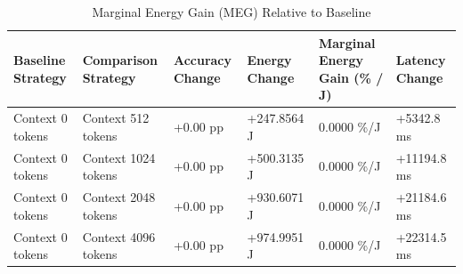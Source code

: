 \begin{table}
\caption{Marginal Energy Gain (MEG) Relative to Baseline}
\label{tab:marginal_energy_gain}
\begin{tabular}{llllll}
\toprule
Baseline Strategy & Comparison Strategy & Accuracy Change & Energy Change & Marginal Energy Gain (\% / J) & Latency Change \\
\midrule
Context 0 tokens & Context 512 tokens & +0.00 pp & +247.8564 J & 0.0000 \%/J & +5342.8 ms \\
Context 0 tokens & Context 1024 tokens & +0.00 pp & +500.3135 J & 0.0000 \%/J & +11194.8 ms \\
Context 0 tokens & Context 2048 tokens & +0.00 pp & +930.6071 J & 0.0000 \%/J & +21184.6 ms \\
Context 0 tokens & Context 4096 tokens & +0.00 pp & +974.9951 J & 0.0000 \%/J & +22314.5 ms \\
\bottomrule
\end{tabular}
\end{table}
